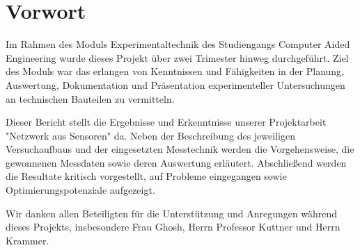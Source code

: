 
\chapter*{Vorwort}
\thispagestyle{empty} %
\todo{}

Im Rahmen des Moduls Experimentaltechnik des Studiengangs Computer Aided Engineering wurde dieses Projekt über zwei Trimester hinweg durchgeführt.
Ziel des Moduls war das erlangen von Kenntnissen und Fähigkeiten in der Planung, Auswertung, Dokumentation und Präsentation experimenteller Untersuchungen an technischen Bauteilen zu vermitteln.

Dieser Bericht stellt die Ergebnisse und Erkenntnisse unserer Projektarbeit "Netzwerk aus Sensoren" da. Neben der Beschreibung des jeweiligen Versuchaufbaus und der eingesetzten Messtechnik  werden die Vorgehensweise, die gewonnenen Messdaten sowie deren Auswertung erläutert. Abschließend werden die Resultate kritisch vorgestellt, auf Probleme eingegangen sowie Optimierungspotenziale aufgezeigt.

Wir danken allen Beteiligten für die Unterstützung und Anregungen während dieses Projekts, insbesondere Frau Ghosh, Herrn Professor Kuttner und Herrn Krammer.
